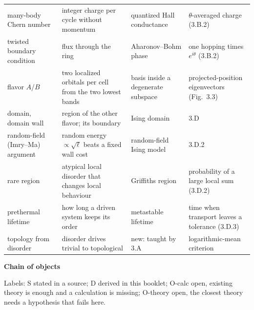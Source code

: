 \documentclass[11pt,a4paper]{article}
\newcommand{\smallheading}[1]{\par\Needspace{6\baselineskip}\medskip\textbf{#1}\par}
\begin{document}
{\begin{longtable}{@{}p{30mm}p{45mm}p{38mm}p{40mm}@{}}
many-body Chern number&integer charge per cycle without momentum&quantized Hall conductance&$\theta$-averaged charge (3.B.2)\\
twisted boundary condition&flux through the ring&Aharonov--Bohm phase&one hopping times $e^{i\theta}$ (3.B.2)\\
flavor $A$/$B$&two localized orbitals per cell from the two lowest bands&basis inside a degenerate subspace&projected-position eigenvectors (Fig.\ 3.3)\\
domain, domain wall&region of the other flavor; its boundary&Ising domain&3.D\\
random-field (Imry--Ma) argument&random energy $\propto\sqrt\ell$ beats a fixed wall cost&random-field Ising model&3.D.2\\
rare region&atypical local disorder that changes local behaviour&Griffiths region&probability of a large local sum (3.D.2)\\
prethermal lifetime&how long a driven system keeps its order&metastable lifetime&time when transport leaves a tolerance (3.D.3)\\
topology from disorder&disorder drives trivial to topological&new: taught by 3.A&logarithmic-mean criterion\\
\bottomrule\end{longtable}}

\smallheading{Chain of objects}
Labels: S stated in a source; D derived in this booklet; O-calc open, existing theory is enough and a calculation is missing; O-theory open, the closest theory needs a hypothesis that fails here.
\end{document}
